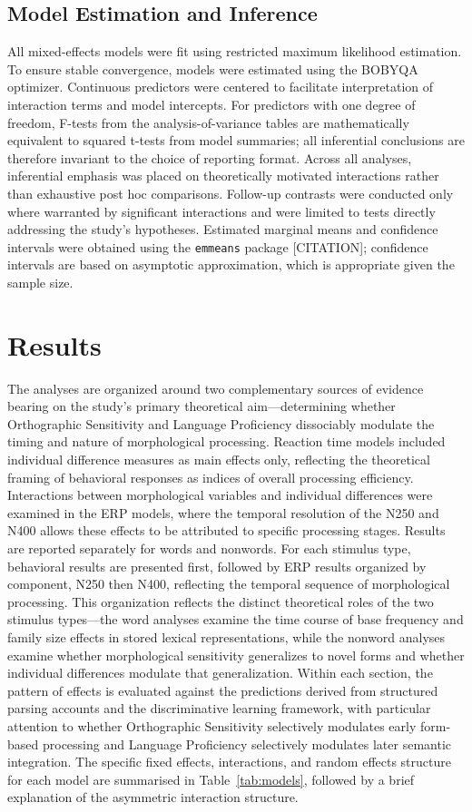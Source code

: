 \documentclass[utf8]{FrontiersinHarvard} %
\begin{document}
	\subsection{Model Estimation and Inference}
	All mixed-effects models were fit using restricted maximum likelihood estimation. To ensure stable convergence, models were estimated using the BOBYQA optimizer. Continuous predictors were centered to facilitate interpretation of interaction terms and model intercepts. For predictors with one degree of freedom, F-tests from the analysis-of-variance tables are mathematically equivalent to squared t-tests from model summaries; all inferential conclusions are therefore invariant to the choice of reporting format. Across all analyses, inferential emphasis was placed on theoretically motivated interactions rather than exhaustive post hoc comparisons. Follow-up contrasts were conducted only where warranted by significant interactions and were limited to tests directly addressing the study’s hypotheses. Estimated marginal means and confidence intervals were obtained using the \texttt{emmeans} package [CITATION]; confidence intervals are based on asymptotic approximation, which is appropriate given the sample size.
	
	\section{Results}
	
	The analyses are organized around two complementary sources of evidence bearing on the study's primary theoretical aim—determining whether Orthographic Sensitivity and Language Proficiency dissociably modulate the timing and nature of morphological processing. Reaction time models included individual difference measures as main effects only, reflecting the theoretical framing of behavioral responses as indices of overall processing efficiency. Interactions between morphological variables and individual differences were examined in the ERP models, where the temporal resolution of the N250 and N400 allows these effects to be attributed to specific processing stages. Results are reported separately for words and nonwords. For each stimulus type, behavioral results are presented first, followed by ERP results organized by component, N250 then N400, reflecting the temporal sequence of morphological processing. This organization reflects the distinct theoretical roles of the two stimulus types—the word analyses examine the time course of base frequency and family size effects in stored lexical representations, while the nonword analyses examine whether morphological sensitivity generalizes to novel forms and whether individual differences modulate that generalization. Within each section, the pattern of effects is evaluated against the predictions derived from structured parsing accounts and the discriminative learning framework, with particular attention to whether Orthographic Sensitivity selectively modulates early form-based processing and Language Proficiency selectively modulates later semantic integration. The specific fixed effects, interactions, and random effects structure for each model are summarised in Table~\ref{tab:models}, followed by a brief explanation of the asymmetric interaction structure.
	
\end{document}
